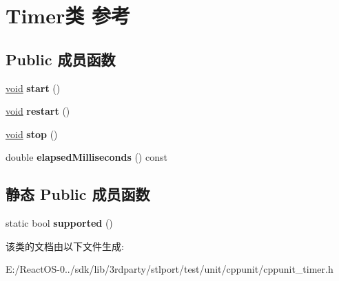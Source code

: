 \hypertarget{class_timer}{}\section{Timer类 参考}
\label{class_timer}
\subsection*{Public 成员函数}
\begin{DoxyCompactItemize}
\item 
\mbox{\label{class_timer_a3a8b5272198d029779dc9302a54305a8}} 
\hyperlink{interfacevoid}{void} {\bfseries start} ()
\item 
\mbox{\label{class_timer_aa3f7871196bb56202af2bc982bfbfff6}} 
\hyperlink{interfacevoid}{void} {\bfseries restart} ()
\item 
\mbox{\label{class_timer_a63f0eb44b27402196590a03781515dba}} 
\hyperlink{interfacevoid}{void} {\bfseries stop} ()
\item 
\mbox{\label{class_timer_a820caa3e5af368d19a748828be2c6971}} 
double {\bfseries elapsed\+Milliseconds} () const
\end{DoxyCompactItemize}
\subsection*{静态 Public 成员函数}
\begin{DoxyCompactItemize}
\item 
\mbox{\label{class_timer_af7795edc05b8d20ae46e246138f79896}} 
static bool {\bfseries supported} ()
\end{DoxyCompactItemize}


该类的文档由以下文件生成\+:\begin{DoxyCompactItemize}
\item 
E\+:/\+React\+O\+S-\/0../sdk/lib/3rdparty/stlport/test/unit/cppunit/cppunit\+\_\+timer.\+h\end{DoxyCompactItemize}
